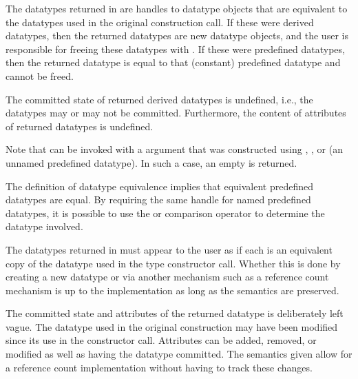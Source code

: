 The datatypes returned in  are handles to
datatype objects that are equivalent to the datatypes used in the
original construction call.  If these were derived datatypes, then
the returned datatypes are new datatype objects, and the
user is responsible for freeing these datatypes with
.
If these were predefined datatypes, then
the returned datatype is equal to that (constant) predefined datatype
and cannot be freed.

The committed state of returned derived datatypes is undefined,
i.e., the datatypes may or
may not be committed.  Furthermore, the content of attributes of
returned datatypes is undefined.

Note that  can be invoked with a
 argument that was constructed using
,\flushline
{}, or
  (an unnamed predefined datatype).
In such a case, an empty  is returned.

\begin{rationale}
The definition of datatype equivalence implies that equivalent
predefined datatypes are equal.
By requiring the same handle for named predefined datatypes, it is
possible to use the \code{==} or  comparison operator to determine the
datatype involved.
\end{rationale}

\begin{implementors}
The datatypes returned in  must appear to the
user as if each is an equivalent copy of the datatype used in the type
constructor call.
Whether this is done by
creating a new datatype or via another mechanism such as a reference
count mechanism is up to the implementation as long as the semantics
are preserved.
\end{implementors}

\begin{rationale}
The committed state and attributes of the returned datatype is
deliberately left vague.  The datatype used in the original
construction may have been modified since its use in the constructor
call.  Attributes can be added, removed, or modified as well as having
the datatype committed.  The semantics given allow for a
reference count implementation without having to track these changes.
\end{rationale}

